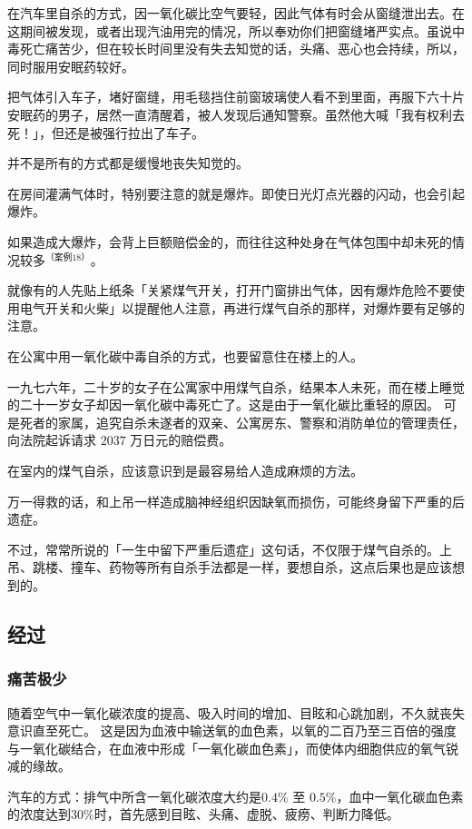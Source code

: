 \documentclass[UTF8]{ctexart}
\begin{document}
在汽车里自杀的方式，因一氧化碳比空气要轻，因此气体有时会从窗缝泄出去。在这期间被发现，或者出现汽油用完的情况，所以奉劝你们把窗缝堵严实点。虽说中毒死亡痛苦少，但在较长时间里没有失去知觉的话，头痛、恶心也会持续，所以，同时服用安眠药较好。

把气体引入车子，堵好窗缝，用毛毯挡住前窗玻璃使人看不到里面，再服下六十片安眠药的男子，居然一直清醒着，被人发现后通知警察。虽然他大喊「我有权利去死！」，但还是被强行拉出了车子。

并不是所有的方式都是缓慢地丧失知觉的。 

在房间灌满气体时，特别要注意的就是爆炸。即使日光灯点光器的闪动，也会引起爆炸。

如果造成大爆炸，会背上巨额赔偿金的，而往往这种处身在气体包围中却未死的情况较多$^{（案例 18）}$。

就像有的人先贴上纸条「关紧煤气开关，打开门窗排出气体，因有爆炸危险不要使用电气开关和火柴」以提醒他人注意，再进行煤气自杀的那样，对爆炸要有足够的注意。

在公寓中用一氧化碳中毒自杀的方式，也要留意住在楼上的人。

一九七六年，二十岁的女子在公寓家中用煤气自杀，结果本人未死，而在楼上睡觉的二十一岁女子却因一氧化碳中毒死亡了。这是由于一氧化碳比重轻的原因。
可是死者的家属，追究自杀未遂者的双亲、公寓房东、警察和消防单位的管理责任，向法院起诉请求 $2037$ 万日元的赔偿费。

在室内的煤气自杀，应该意识到是最容易给人造成麻烦的方法。

万一得救的话，和上吊一样造成脑神经组织因缺氧而损伤，可能终身留下严重的后遗症。

不过，常常所说的「一生中留下严重后遗症」这句话，不仅限于煤气自杀的。上吊、跳楼、撞车、药物等所有自杀手法都是一样，要想自杀，这点后果也是应该想到的。


\subsection{经过}

\subsubsection*{痛苦极少}

随着空气中一氧化碳浓度的提高、吸入时间的增加、目眩和心跳加剧，不久就丧失意识直至死亡。
这是因为血液中输送氧的血色素，以氧的二百乃至三百倍的强度与一氧化碳结合，在血液中形成「一氧化碳血色素」，而使体内细胞供应的氧气锐减的缘故。

汽车的方式：排气中所含一氧化碳浓度大约是$0.4\%$ 至 $0.5\%$，血中一氧化碳血色素的浓度达到$30\%$时，首先感到目眩、头痛、虚脱、疲痨、判断力降低。
\end{document}
